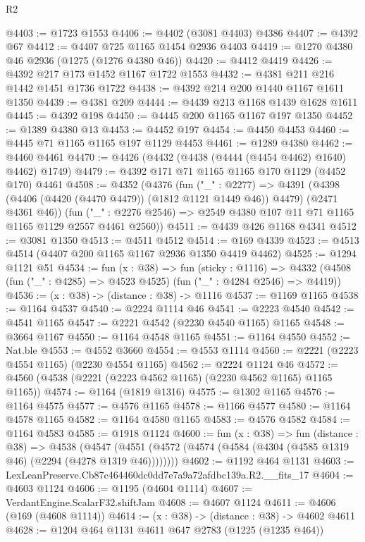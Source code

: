 \begin{lexlean}{R2}
\begin{coremodule}
@4403 := @1723 @1553
@4406 := @4402 (@3081 @4403) @4386
@4407 := @4392 @67
@4412 := @4407 @725 @1165 @1454 @2936 @4403
@4419 := @1270 @4380 @46 @2936 (@1275 (@1276 @4380 @46))
@4420 := @4412 @4419
@4426 := @4392 @217 @173 @1452 @1167 @1722 @1553
@4432 := @4381 @211 @216 @1442 @1451 @1736 @1722
@4438 := @4392 @214 @200 @1440 @1167 @1611 @1350
@4439 := @4381 @209
@4444 := @4439 @213 @1168 @1439 @1628 @1611
@4445 := @4392 @198
@4450 := @4445 @200 @1165 @1167 @197 @1350
@4452 := @1389 @4380 @13
@4453 := @4452 @197
@4454 := @4450 @4453
@4460 := @4445 @71 @1165 @1165 @197 @1129 @4453
@4461 := @1289 @4380
@4462 := @4460 @4461
@4470 := @4426 (@4432 (@4438 (@4444 (@4454 @4462) @1640) @4462) @1749)
@4479 := @4392 @171 @71 @1165 @1165 @170 @1129 (@4452 @170) @4461
@4508 := @4352
    (@4376
      (fun ("_" : @2277) =>
      @4391 (@4398 (@4406 (@4420 (@4470 @4479)) (@1812 @1121 @1449 @46)) @4479) (@2471 @4361 @46))
      (fun ("_" : @2276 @2546) => @2549 @4380 @107 @11 @71 @1165 @1165 @1129 @2557 @4461 @2560))
@4511 := @4439 @426 @1168 @4341
@4512 := @3081 @1350
@4513 := @4511 @4512
@4514 := @169 @4339
@4523 := @4513 @4514 (@4407 @200 @1165 @1167 @2936 @1350 @4419 @4462)
@4525 := @1294 @1121 @51
@4534 := fun (x : @38) =>
  fun (sticky : @1116) =>
  @4332 (@4508 (fun ("_" : @4285) => @4523 @4525) (fun ("_" : @4284 @2546) => @4419))
@4536 := (x : @38) -> (distance : @38) -> @1116
@4537 := @1169 @1165
@4538 := @1164 @4537
@4540 := @2224 @1114 @46
@4541 := @2223 @4540
@4542 := @4541 @1165
@4547 := @2221 @4542 (@2230 @4540 @1165) @1165
@4548 := @3664 @1167
@4550 := @1164 @4548 @1165
@4551 := @1164 @4550
@4552 := Nat.ble
@4553 := @4552 @3660
@4554 := @4553 @1114
@4560 := @2221 (@2223 @4554 @1165) (@2230 @4554 @1165)
@4562 := @2224 @1124 @46
@4572 := @4560 (@4538 (@2221 (@2223 @4562 @1165) (@2230 @4562 @1165) @1165 @1165))
@4574 := @1164 (@1819 @1316)
@4575 := @1302 @1165
@4576 := @1164 @4575
@4577 := @4576 @1165
@4578 := @1166 @4577
@4580 := @1164 @4578 @1165
@4582 := @1164 @4580 @1165
@4583 := @4576 @4582
@4584 := @1164 @4583
@4585 := @1918 @1124
@4600 := fun (x : @38) =>
  fun (distance : @38) =>
  @4538 (@4547 (@4551 (@4572 (@4574 (@4584 (@4304 (@4585 @1319 @46) (@2294 (@4278 @1319 @46))))))))
@4602 := @1192 @464 @1131
@4603 := LexLeanPreserve.Cb87c464460dc0dd7e7a9a72afdbc139a.R2.__fits_17
@4604 := @4603 @1124
@4606 := @1195 (@4604 @1114)
@4607 := VerdantEngine.ScalarF32.shiftJam
@4608 := @4607 @1124
@4611 := @4606 (@169 (@4608 @1114))
@4614 := (x : @38) -> (distance : @38) -> @4602 @4611
@4628 := @1204
    @464
    @1131
    @4611
    @647
    @2783
    (@1225 (@1235 @464))

\end{coremodule}
\end{lexlean}
